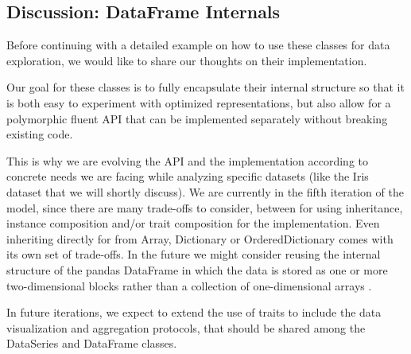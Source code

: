 \documentclass[sigplan]{acmart}
\begin{document}
\subsection*{Discussion: DataFrame Internals}
\label{sec:internals}

Before continuing with a detailed example on how to use these classes for data exploration, we would like to share our thoughts on their implementation. 

Our goal for these classes is to fully encapsulate their internal structure so that it is both easy to experiment with optimized  representations, but also allow for a polymorphic fluent API that can be implemented separately without breaking existing code. 

This is why we are evolving the API and the implementation according to concrete needs we are facing while analyzing specific datasets (like the Iris dataset that we will shortly discuss). We are currently in the fifth iteration of the model, since there are many trade-offs to consider, between for \eg using inheritance, instance composition and/or trait composition for the implementation. Even inheriting directly for \eg from Array, Dictionary or OrderedDictionary comes with its own set of trade-offs. In the future we might consider reusing the internal structure of the pandas DataFrame in which the data is stored as one or more two-dimensional blocks rather than a collection of one-dimensional arrays \cite{McKinney}. 

In future iterations, we expect to extend the use of traits to include the data visualization and aggregation protocols, that should be shared among the DataSeries and DataFrame classes. 
\end{document}
